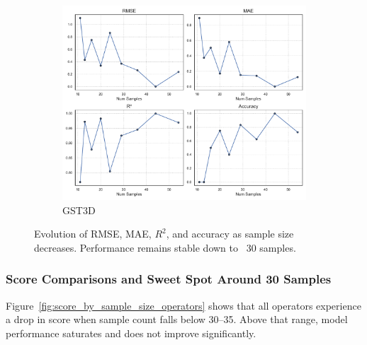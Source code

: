 \begin{figure}[htbp]
    \hfill
    \begin{subfigure}[t]{0.32\textwidth}
        \includegraphics[width=\textwidth]{assets/images/05/metrics_evolution_by_sample_size_gst3d}
        \caption{\ac{GST3D}}
    \end{subfigure}
    \caption{Evolution of \ac{RMSE}, \ac{MAE}, $R^2$, and accuracy as sample size decreases. Performance remains stable down to ~30 samples.}
    \label{fig:metrics_evolution_sample_size_operators}
\end{figure}

\subsubsection{Score Comparisons and Sweet Spot Around 30 Samples}
\label{subsec:score-comparisons-and-sweet-spot}

Figure~\ref{fig:score_by_sample_size_operators} shows that all operators experience a drop in score when sample count falls below 30--35.
Above that range, model performance saturates and does not improve significantly.

